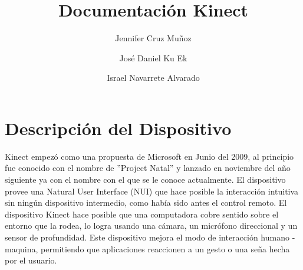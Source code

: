 \documentclass[11pt,a4paper]{article}
\author{Jennifer Cruz Muñoz \and José Daniel Ku Ek \and Israel Navarrete Alvarado}
\title{Documentación Kinect}
\begin{document}
\maketitle
\newpage
\tableofcontents
\newpage
\section{Descripción del Dispositivo}
Kinect empezó como una propuesta de Microsoft en Junio del 2009, al principio fue conocido con el nombre de ''Project Natal'' y lanzado en noviembre del año siguiente ya con el nombre con el que se le conoce actualmente. El dispositivo provee una Natural User Interface (NUI) que hace posible la interacción intuitiva sin ningún dispositivo intermedio, como había sido antes el control remoto. 
El dispositivo Kinect hace posible que una computadora cobre sentido sobre el entorno que la rodea, lo logra usando una cámara, un micrófono direccional y un sensor de profundidad. Este dispositivo mejora el modo de interacción humano - maquina, permitiendo que aplicaciones reaccionen a un gesto o una seña hecha por el usuario.
\end{document}
